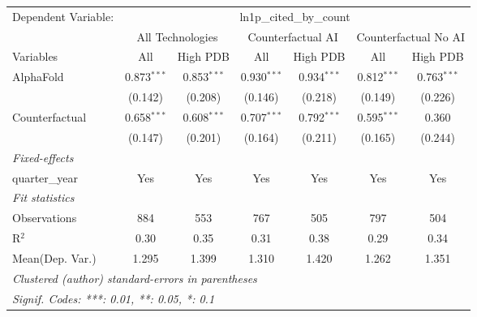 \begingroup
\centering
\begin{tabular}{lcccccc}
   \tabularnewline \midrule \midrule
   Dependent Variable: & \multicolumn{6}{c}{ln1p\_cited\_by\_count}\\
 & \multicolumn{2}{c}{All Technologies} & \multicolumn{2}{c}{Counterfactual AI} & \multicolumn{2}{c}{Counterfactual No AI} \\
\cmidrule(lr){1-1}\cmidrule(lr){2-3} \cmidrule(lr){4-5} \cmidrule(lr){6-7}
Variables & \multicolumn{1}{c}{All} & \multicolumn{1}{c}{High PDB} & \multicolumn{1}{c}{All} & \multicolumn{1}{c}{High PDB} & \multicolumn{1}{c}{All} & \multicolumn{1}{c}{High PDB} \\
\cmidrule(lr){1-1}\cmidrule(lr){2-2} \cmidrule(lr){3-3} \cmidrule(lr){4-4} \cmidrule(lr){5-5} \cmidrule(lr){6-6} \cmidrule(lr){7-7}
   AlphaFold      & 0.873$^{***}$ & 0.853$^{***}$ & 0.930$^{***}$ & 0.934$^{***}$ & 0.812$^{***}$ & 0.763$^{***}$\\   
                  & (0.142)       & (0.208)       & (0.146)       & (0.218)       & (0.149)       & (0.226)\\   
   Counterfactual & 0.658$^{***}$ & 0.608$^{***}$ & 0.707$^{***}$ & 0.792$^{***}$ & 0.595$^{***}$ & 0.360\\   
                  & (0.147)       & (0.201)       & (0.164)       & (0.211)       & (0.165)       & (0.244)\\   
   \midrule
   \emph{Fixed-effects}\\
   quarter\_year  & Yes           & Yes           & Yes           & Yes           & Yes           & Yes\\  
   \midrule
   \emph{Fit statistics}\\
   Observations   & 884           & 553           & 767           & 505           & 797           & 504\\  
   R$^2$          & 0.30          & 0.35          & 0.31          & 0.38          & 0.29          & 0.34\\  
Mean(Dep. Var.) & 1.295 & 1.399 & 1.310 & 1.420 & 1.262 & 1.351 \\
   \midrule \midrule
   \multicolumn{7}{l}{\emph{Clustered (author) standard-errors in parentheses}}\\
   \multicolumn{7}{l}{\emph{Signif. Codes: ***: 0.01, **: 0.05, *: 0.1}}\\
\end{tabular}
\par\endgroup

